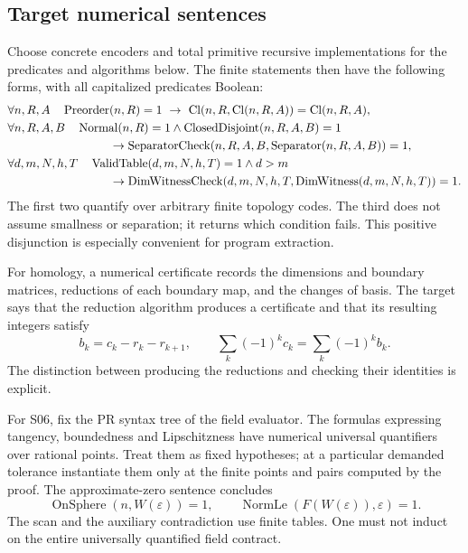 \subsection{Target numerical sentences}

Choose concrete encoders and total primitive recursive implementations for the predicates and algorithms below. The finite statements then have the following forms, with all capitalized predicates Boolean:
\begin{align*}
 &\forall n,R,A\quad
  \operatorname{Preorder}(n,R)=1
  \ \to\
  \operatorname{Cl}(n,R,\operatorname{Cl}(n,R,A))
     =\operatorname{Cl}(n,R,A),\\
 &\forall n,R,A,B\quad
  \operatorname{Normal}(n,R)=1\wedge
  \operatorname{ClosedDisjoint}(n,R,A,B)=1\\
 &\hspace{30mm}\to
  \operatorname{SeparatorCheck}(n,R,A,B,
        \operatorname{Separator}(n,R,A,B))=1,\\
 &\forall d,m,N,h,T\quad
  \operatorname{ValidTable}(d,m,N,h,T)=1\wedge d>m\\
 &\hspace{30mm}\to
  \operatorname{DimWitnessCheck}(d,m,N,h,T,
        \operatorname{DimWitness}(d,m,N,h,T))=1 .
\end{align*}
The first two quantify over arbitrary finite topology codes. The third does not assume smallness or separation; it returns which condition fails. This positive disjunction is especially convenient for program extraction.

For homology, a numerical certificate records the dimensions and boundary matrices, reductions of each boundary map, and the changes of basis. The target says that the reduction algorithm produces a certificate and that its resulting integers satisfy
\[
 b_k=c_k-r_k-r_{k+1},\qquad
 \sum_k(-1)^kc_k=\sum_k(-1)^kb_k.
\]
The distinction between producing the reductions and checking their identities is explicit.

For S06, fix the PR syntax tree of the field evaluator. The formulas expressing tangency, boundedness and Lipschitzness have numerical universal quantifiers over rational points. Treat them as fixed hypotheses; at a particular demanded tolerance instantiate them only at the finite points and pairs computed by the proof. The approximate-zero sentence concludes
\[
 \operatorname{OnSphere}(n,W(\varepsilon))=1,\qquad
 \operatorname{NormLe}(F(W(\varepsilon)),\varepsilon)=1.
\]
The scan and the auxiliary contradiction use finite tables. One must not induct on the entire universally quantified field contract.

